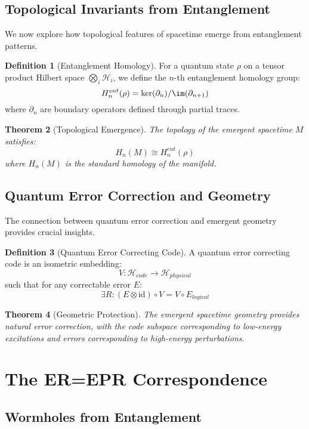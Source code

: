 \documentclass[12pt,a4paper]{article}
\newcommand{\Hilb}{\mathcal{H}}
\newcommand{\id}{\mathrm{id}}
\theoremstyle{plain}
\newtheorem{theorem}{Theorem}[section]
\theoremstyle{definition}
\newtheorem{definition}[theorem]{Definition}
\theoremstyle{remark}
\begin{document}
\subsection{Topological Invariants from Entanglement}

We now explore how topological features of spacetime emerge from entanglement patterns.

\begin{definition}[Entanglement Homology]
For a quantum state $\rho$ on a tensor product Hilbert space $\bigotimes_i \Hilb_i$, we define the $n$-th entanglement homology group:
\[H_n^{ent}(\rho) = \ker(\partial_n) / \im(\partial_{n+1})\]
where $\partial_n$ are boundary operators defined through partial traces.
\end{definition}

\begin{theorem}[Topological Emergence]
The topology of the emergent spacetime $M$ satisfies:
\[H_n(M) \cong H_n^{ent}(\rho)\]
where $H_n(M)$ is the standard homology of the manifold.
\end{theorem}

\subsection{Quantum Error Correction and Geometry}

The connection between quantum error correction and emergent geometry provides crucial insights.

\begin{definition}[Quantum Error Correcting Code]
A quantum error correcting code is an isometric embedding:
\[V: \Hilb_{code} \to \Hilb_{physical}\]
such that for any correctable error $E$:
\[\exists R: (E \otimes \id) \circ V = V \circ E_{logical}\]
\end{definition}

\begin{theorem}[Geometric Protection]
The emergent spacetime geometry provides natural error correction, with the code subspace corresponding to low-energy excitations and errors corresponding to high-energy perturbations.
\end{theorem}

\section{The ER=EPR Correspondence}

\subsection{Wormholes from Entanglement}
\end{document}

